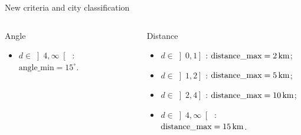 \begin{frame}{New criteria and city classification}
\begin{columns}
\begin{column}{0.4\paperwidth}
\begin{block}{Angle}
\begin{itemize}
                    \item $d\in\left]4, \infty\right[$ : $\text{angle\_min}=15^\circ$.
                \end{itemize}
            \end{block}
        \end{column}
        \begin{column}{0.4\paperwidth}
            \begin{block}{Distance}
                \begin{itemize}
                    \item $d\in\left]0, 1\right]$ : $\text{distance\_max}=\unit[2]{km}$;
                    \item $d\in\left]1, 2\right]$ : $\text{distance\_max}=\unit[5]{km}$;
                    \item $d\in\left]2, 4\right]$ : $\text{distance\_max}=\unit[10]{km}$;
                    \item $d\in\left]4, \infty\right[$ : $\text{distance\_max}=\unit[15]{km}$.
                \end{itemize}
            \end{block}
        \end{column}
    \end{columns}
\end{frame}